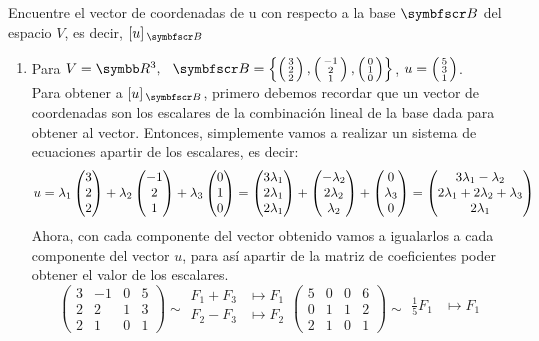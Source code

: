 \item Encuentre el vector de coordenadas de u con respecto a la base \(\fb\) del espacio \(V\), es decir, \(\veccoord{u}{\fb}\)
    \begin{enumerate}[label=\listAlph]
        \item Para \(V = \realR^3, \hspace{0.25cm} \fb = \fset{\fsmvec{3,2,2}, \fsmvec{-1,2,1}, \fsmvec{0,1,0}}\), \(u = \fsmvec{5,3,1}\). \\
            Para obtener a \(\veccoord{u}{\fb}\), primero debemos recordar que un vector de coordenadas son los escalares de la combinación lineal de la base dada para obtener al vector.
            Entonces, simplemente vamos a realizar un sistema de ecuaciones apartir de los escalares, es decir:
            \[
                u = \lambda_1 \fvec{3,2,2} + \lambda_2 \fvec{-1,2,1} + \lambda_3 \fvec{0,1,0} 
                = \fvec{3\lambda_1, 2\lambda_1, 2\lambda_1} + \fvec{-\lambda_2, 2\lambda_2, \lambda_2} + \fvec{0, \lambda_3, 0}
                = \fvec{3\lambda_1 -\lambda_2, 2\lambda_1 + 2\lambda_2 + \lambda_3,  2\lambda_1}
            \]
            Ahora, con cada componente del vector obtenido vamos a igualarlos a cada componente del vector \(u\), 
            para así apartir de la matriz de coeficientes poder obtener el valor de los escalares.
            \[
                \left(
                \begin{array}{ccc|c}
                    3 & -1 & 0 & 5 \\
                    2 & 2 & 1 & 3 \\
                    2 & 1 & 0 & 1
                \end{array}
                \right)
                \sim
                \begin{aligned}
                    F_1 + F_3 &\mapsto F_1 \\
                    F_2 - F_3 &\mapsto F_2 \\
                \end{aligned}
                \left(
                \begin{array}{ccc|c}
                    5 & 0 & 0 & 6 \\
                    0 & 1 & 1 & 2 \\
                    2 & 1 & 0 & 1
                \end{array}
                \right)
                \sim
                \begin{aligned}
                    \frac{1}{5}F_1 &\mapsto F_1 \\

\end{aligned}\]
\end{enumerate}
